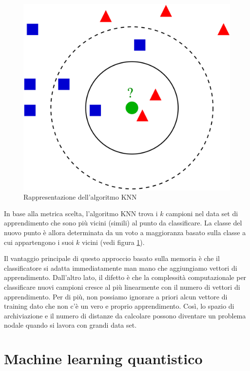 \begin{figure}[h!]
    \centering
    \includegraphics[width=.8\linewidth]{gfx/KnnClassification}
    \caption{Rappresentazione dell'algoritmo \ac{KNN}}
    \label{fig:knn}
\end{figure}

In base alla metrica scelta, l'algoritmo \ac{KNN} trova i $k$ campioni 
nel data set di apprendimento che sono più vicini (simili) al punto 
da classificare. La classe del nuovo punto è allora determinata da un 
voto a maggioranza basato sulla classe a cui appartengono i suoi $k$ 
vicini (vedi figura \ref{fig:knn}). 

Il vantaggio principale di 
questo approccio basato sulla memoria è che il classificatore si 
adatta immediatamente man mano che aggiungiamo vettori di apprendimento. 
Dall'altro lato, il difetto è che la complessità computazionale per 
classificare nuovi campioni cresce al più linearmente con il numero di 
vettori di apprendimento. Per di più, non possiamo ignorare a priori 
alcun vettore di training dato che non c'è un vero e proprio apprendimento. 
Così, lo spazio di archiviazione e il numero di distanze da calcolare possono 
diventare un problema nodale quando si lavora con grandi data set. \cite{pml}

\section{Machine learning quantistico} \label{sec:qml}


